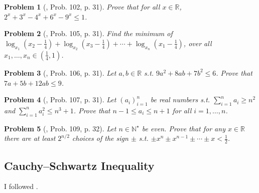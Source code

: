 \documentclass[oneside]{book}
\numberwithin{equation}{section}
\newtheorem{problem}{Problem}[section]
\begin{document}
\begin{problem}[\cite{Gelca_Andreescu2017}, Prob. 102, p. 31]
	Prove that for all $x\in\mathbb{R}$, $2^x + 3^x - 4^x + 6^x - 9^x\le 1$.
\end{problem}

\begin{problem}[\cite{Gelca_Andreescu2017}, Prob. 105, p. 31]
	Find the minimum of $\log_{x_1}\left(x_2 - \frac{1}{4}\right) + \log_{x_2}\left(x_3 - \frac{1}{4}\right) + \cdots + \log_{x_n}\left(x_1 - \frac{1}{4}\right)$, over all $x_1,\ldots,x_n\in\left(\frac{1}{4},1\right)$.
\end{problem}

\begin{problem}[\cite{Gelca_Andreescu2017}, Prob. 106, p. 31]
	Let $a,b\in\mathbb{R}$ s.t. $9a^2 + 8ab + 7b^2\le 6$. Prove that $7a + 5b + 12ab\le 9$.
\end{problem}

\begin{problem}[\cite{Gelca_Andreescu2017}, Prob. 107, p. 31]
	Let $(a_i)_{i=1}^n$ be real numbers s.t. $\sum_{i=1}^n a_i\ge n^2$ and $\sum_{i=1}^n a_i^2\le n^3 + 1$. Prove that $n - 1\le a_i\le n + 1$ for all $i = 1,\ldots,n$.
\end{problem}

\begin{problem}[\cite{Gelca_Andreescu2017}, Prob. 109, p. 32]
	Let $n\in\mathbb{N}^\star$ be even. Prove that for any $x\in\mathbb{R}$ there are at least $2^{n/2}$ choices of the sign $\pm$ s.t. $\pm x^n\pm x^{n-1}\pm\cdots\pm x < \frac{1}{2}$.
\end{problem}

\subsection{Cauchy--Schwartz Inequality}
I followed \cite[Subsect. 2.1.3, p. 32]{Gelca_Andreescu2017}.
\end{document}
